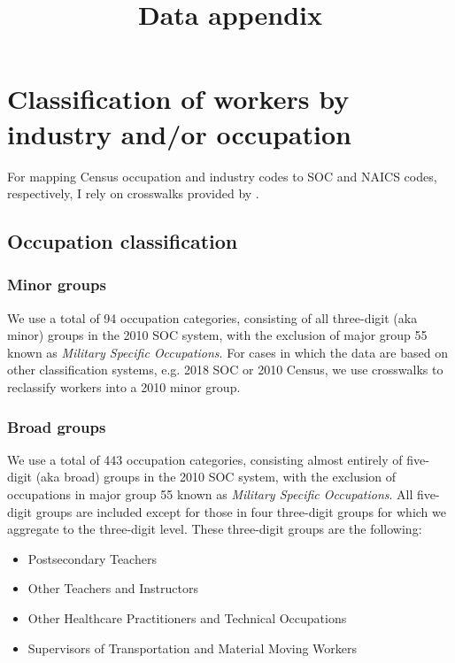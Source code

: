\documentclass{article}
\title{Data appendix}
\author{}
\date{}
\begin{document}
\maketitle

\tableofcontents

\section{Classification of workers by industry and/or occupation}
For mapping Census occupation and industry codes to SOC and NAICS codes, respectively, I rely on crosswalks provided by \cite{crosswalks}.

\subsection{Occupation classification}

\subsubsection{Minor groups}
We use a total of 94 occupation categories, consisting of all three-digit (aka minor) groups in the 2010 SOC system, with the exclusion of major group 55 known as \emph{Military Specific Occupations}. For cases in which the data are based on other classification systems, e.g. 2018 SOC or 2010 Census, we use crosswalks to reclassify workers into a 2010 minor group.

\subsubsection{Broad groups}
We use a total of 443 occupation categories, consisting almost entirely of five-digit (aka broad) groups in the 2010 SOC system, with the exclusion of occupations in major group 55 known as \emph{Military Specific Occupations}.
All five-digit groups are included except for those in four three-digit groups for which we aggregate to the three-digit level. These three-digit groups are the following:
\begin{itemize}
\item Postsecondary Teachers
\item Other Teachers and Instructors
\item Other Healthcare Practitioners and Technical Occupations
\item Supervisors of Transportation and Material Moving Workers
\end{itemize}
\end{document}
